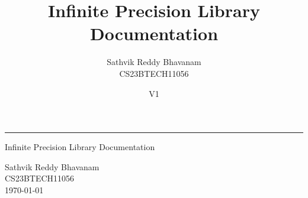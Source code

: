 \documentclass{article} %
\title{\huge \sffamily Infinite Precision Library Documentation}
\author{\sffamily Sathvik Reddy Bhavanam\\[2mm] \sffamily CS23BTECH11056}
\date{V1}
\begin{document}
\thispagestyle{empty}
\vspace*{3cm}
\hspace*{-7mm}\rule{\linewidth}{3pt}
\vspace*{1cm}
\begin{center}
	{\Huge \sffamily Infinite Precision Library Documentation} \\[3em]
\end{center}
{\hfill \Large \sffamily Sathvik Reddy Bhavanam} \\[2em]
{\vspace*{1em} \hfill\large \sffamily CS23BTECH11056} \\[24em]
{\vspace*{1em} \hfill\large \sffamily \today}

\newpage


\tableofcontents
\newpage

 
\newpage
\end{document}

